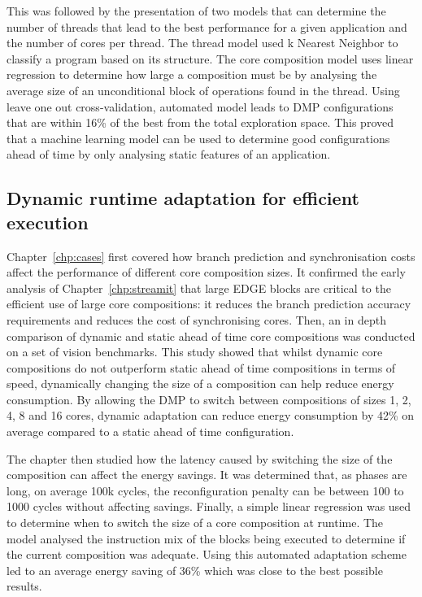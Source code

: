 This was followed by the presentation of two models that can determine the number of threads that lead to the best performance for a given application and the number of cores per thread.
The thread model used k Nearest Neighbor to classify a program based on its structure.
The core composition model uses linear regression to determine how large a composition must be by analysing the average size of an unconditional block of operations found in the thread.
Using leave one out cross-validation, automated model leads to DMP configurations that are within 16\% of the best from the total exploration space.
This proved that a machine learning model can be used to determine good configurations ahead of time by only analysing static features of an application. 

\subsection{Dynamic runtime adaptation for efficient execution}

Chapter~\ref{chp:cases} first covered how branch prediction and synchronisation costs affect the performance of different core composition sizes.
It confirmed the early analysis of Chapter~\ref{chp:streamit} that large EDGE blocks are critical to the efficient use of large core compositions: it reduces the branch prediction accuracy requirements and reduces the cost of synchronising cores.
Then, an in depth comparison of dynamic and static ahead of time core compositions was conducted on a set of vision benchmarks.
This study showed that whilst dynamic core compositions do not outperform static ahead of time compositions in terms of speed, dynamically changing the size of a composition can help reduce energy consumption.
By allowing the DMP to switch between compositions of sizes 1, 2, 4, 8 and 16 cores, dynamic adaptation can reduce energy consumption by 42\% on average compared to a static ahead of time configuration.

The chapter then studied how the latency caused by switching the size of the composition can affect the energy savings.
It was determined that, as phases are long, on average 100k cycles, the reconfiguration penalty can be between 100 to 1000 cycles without affecting savings.
Finally, a simple linear regression was used to determine when to switch the size of a core composition at runtime.
The model analysed the instruction mix of the blocks being executed to determine if the current composition was adequate.
Using this automated adaptation scheme led to an average energy saving of 36\% which was close to the best possible results.

